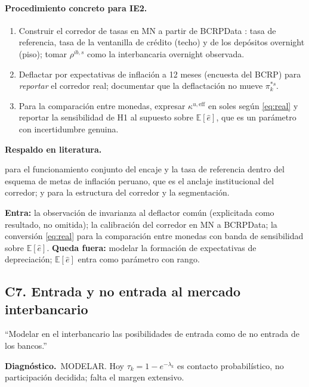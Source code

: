 \documentclass[11pt]{article}
\newcommand{\diag}[1]{\par\noindent\textbf{Diagn\'ostico.}\ #1\par}
\newcommand{\lit}{\par\noindent\textbf{Respaldo en literatura.}\par}
\newcommand{\E}{\mathbb{E}}
\theoremstyle{definition}
\begin{document}
\paragraph{Procedimiento concreto para IE2.}
\begin{enumerate}[leftmargin=*,itemsep=1pt]
\item Construir el corredor de tasas en MN a partir de BCRPData
\citep{bcrpdata}: tasa de referencia, tasa de la ventanilla de cr\'edito (techo) y
de los dep\'ositos overnight (piso); tomar $\rho^{ib,s}$ como la interbancaria
overnight observada.
\item Deflactar por expectativas de inflaci\'on a 12 meses (encuesta del BCRP)
para \emph{reportar} el corredor real; documentar que la deflactaci\'on no mueve
$\pi^{*s}_k$.
\item Para la comparaci\'on entre monedas, expresar $\kappa^{u,\mathrm{eff}}$ en
soles seg\'un \eqref{eq:real} y reportar la sensibilidad de H1 al supuesto sobre
$\E[\hat e]$, que es un par\'ametro con incertidumbre genuina.
\end{enumerate}

\lit
\citet{armas2014} para el funcionamiento conjunto del encaje y la tasa de
referencia dentro del esquema de metas de inflaci\'on peruano, que es el anclaje
institucional del corredor; \citet{armenterlester2017} y \citet{bechklee2011}
para la estructura del corredor y la segmentaci\'on.

\begin{ie2}
\textbf{Entra:} la observaci\'on de invarianza al deflactor com\'un (explicitada
como resultado, no omitida); la calibraci\'on del corredor en MN a BCRPData; la
conversi\'on \eqref{eq:real} para la comparaci\'on entre monedas con banda de
sensibilidad sobre $\E[\hat e]$.
\textbf{Queda fuera:} modelar la formaci\'on de expectativas de depreciaci\'on;
$\E[\hat e]$ entra como par\'ametro con rango.
\end{ie2}

\subsection{C7. Entrada y no entrada al mercado interbancario}\label{sub:C7}

\begin{jurado}
``Modelar en el interbancario las posibilidades de entrada como de no entrada de
los bancos.''
\end{jurado}

\diag{MODELAR. Hoy $\tau_k=1-e^{-\lambda_k}$ es contacto probabil\'istico, no
participaci\'on decidida; falta el margen extensivo.}
\end{document}
